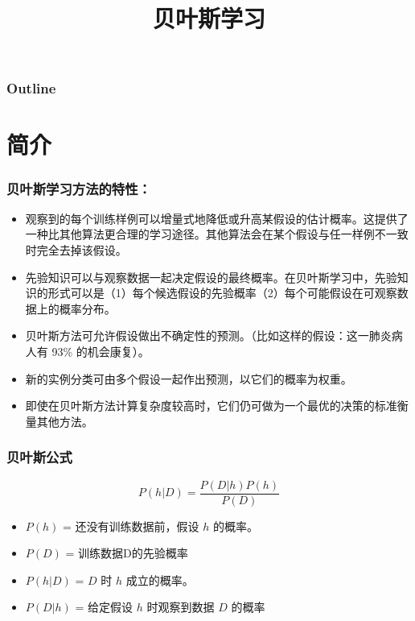 \documentclass{beamer}
\title{贝叶斯学习}
\author{}
\date{}
\begin{document}
\maketitle

\begin{frame}
\frametitle{Outline}
\setcounter{tocdepth}{3}
\tableofcontents
\end{frame}











\section{简介}
\label{sec-1}
\begin{frame}
\frametitle{贝叶斯学习方法的特性：}
\label{sec-1-1}

\begin{itemize}
\item 观察到的每个训练样例可以增量式地降低或升高某假设的估计概率。这提供了一种比其他算法更合理的学习途径。其他算法会在某个假设与任一样例不一致时完全去掉该假设。
\item 先验知识可以与观察数据一起决定假设的最终概率。在贝叶斯学习中，先验知识的形式可以是（1）每个候选假设的先验概率（2）每个可能假设在可观察数据上的概率分布。
\item 贝叶斯方法可允许假设做出不确定性的预测。（比如这样的假设：这一肺炎病人有 93\% 的机会康复）。
\item 新的实例分类可由多个假设一起作出预测，以它们的概率为权重。
\item 即使在贝叶斯方法计算复杂度较高时，它们仍可做为一个最优的决策的标准衡量其他方法。
\end{itemize}
\end{frame}
\begin{frame}
\frametitle{贝叶斯公式}
\label{sec-1-2}


\[ P(h|D) = \frac{P(D|h) P(h)}{P(D)} \]


\begin{itemize}
\item $P(h)$ = 还没有训练数据前，假设 $h$ 的概率。
\item $P(D)$ = 训练数据D的先验概率
\item $P(h|D)$ = $D$ 时 $h$ 成立的概率。
\item $P(D|h)$ = 给定假设 $h$ 时观察到数据 $D$ 的概率
\end{itemize}
\end{frame}
\end{document}
